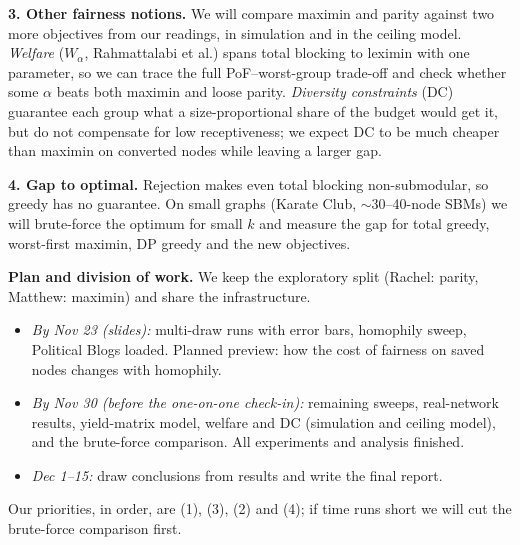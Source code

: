 \documentclass[11pt]{article}
\begin{document}
\textbf{3. Other fairness notions.} We will compare maximin and parity against two
more objectives from our readings, in simulation and in the ceiling model.
\emph{Welfare} ($W_\alpha$, Rahmattalabi et al.) spans total blocking to leximin with
one parameter, so we can trace the full PoF--worst-group trade-off and check whether
some $\alpha$ beats both maximin and loose parity. \emph{Diversity constraints} (DC)
guarantee each group what a size-proportional share of the budget would get it, but
do not compensate for low receptiveness; we expect DC to be much cheaper than maximin
on converted nodes while leaving a larger gap.

\textbf{4. Gap to optimal.} Rejection makes even total blocking non-submodular, so
greedy has no guarantee. On small graphs (Karate Club, $\sim$30--40-node SBMs) we
will brute-force the optimum for small $k$ and measure the gap for total greedy,
worst-first maximin, DP greedy and the new objectives.

\textbf{Plan and division of work.} We keep the exploratory split (Rachel: parity,
Matthew: maximin) and share the infrastructure.
\begin{itemize}
  \item \emph{By Nov 23 (slides):} multi-draw runs with error bars, homophily sweep,
        Political Blogs loaded. Planned preview: how the cost of fairness on saved
        nodes changes with homophily.
  \item \emph{By Nov 30 (before the one-on-one check-in):} remaining sweeps,
        real-network results, yield-matrix model, welfare and DC (simulation and
        ceiling model), and the brute-force comparison. All experiments and analysis
        finished.
  \item \emph{Dec 1--15:} draw conclusions from results and write the final report.
\end{itemize}
Our priorities, in order, are (1), (3), (2) and (4); if time runs short we will
cut the brute-force comparison first.
\end{document}
